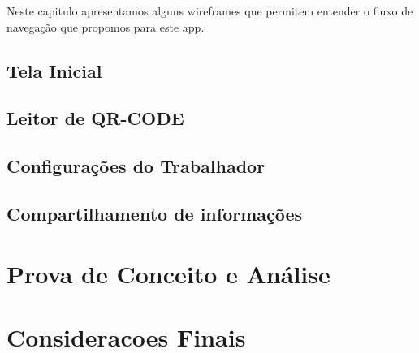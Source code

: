 \documentclass[12pt,openright,twoside,a4paper,english, brazil]{abntex2} %
\begin{document}

Neste capitulo apresentamos alguns wireframes que permitem entender o fluxo de navegação que propomos para este app.

\section{Tela Inicial}

\section{Leitor de QR-CODE}

\section{Configurações do Trabalhador}

\section{Compartilhamento de informações}





\chapter{Prova de Conceito e Análise}






\chapter{Consideracoes Finais}





\apendices
\end{document}
